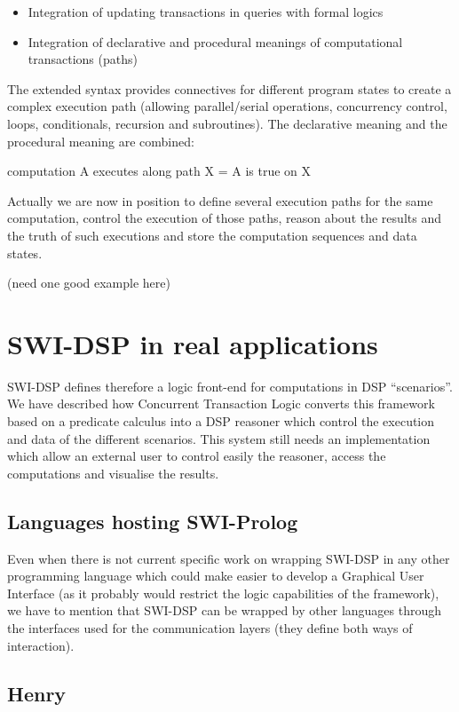 \documentclass[runningheads]{llncs}
\begin{document}
\begin{itemize}
 \item Integration of updating transactions in queries with formal logics
 \item Integration of declarative and procedural meanings of computational transactions (paths)
\end{itemize}

The extended syntax provides connectives for different program states to create a complex execution path (allowing parallel/serial operations, concurrency control, loops, conditionals, recursion and subroutines). The declarative meaning and the procedural meaning are combined:

computation A executes along path X = A is true on X

Actually we are now in position to define several execution paths for the same computation, control the execution of those paths, reason about the results and the truth of such executions and store the computation sequences and data states.

(need one good example here)

\section{SWI-DSP in real applications}\label{sec:realapp}

SWI-DSP defines therefore a logic front-end for computations in DSP ``scenarios''. We have described how Concurrent Transaction Logic converts this framework based on a predicate calculus into a DSP reasoner which control the execution and data of the different scenarios. This system still needs an implementation which allow an external user to control easily the reasoner, access the computations and visualise the results.

\subsection{Languages hosting SWI-Prolog}

Even when there is not current specific work on wrapping SWI-DSP in any other programming language which could make easier to develop a Graphical User Interface (as it probably would restrict the logic capabilities of the framework), we have to mention that SWI-DSP can be wrapped by other languages through the interfaces used for the communication layers (they define both ways of interaction).

\subsection{Henry}\label{subsec:henry}
\end{document}
